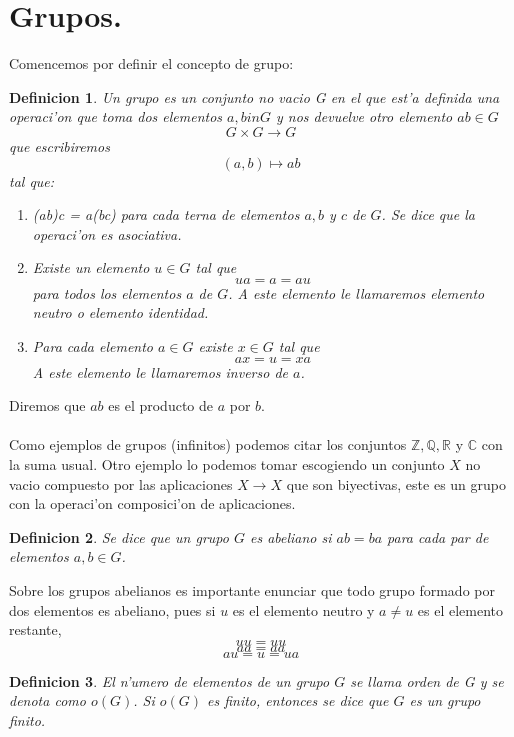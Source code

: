 \documentclass[a4paper,openright,12pt]{report}
\numberwithin{equation}{section} %
\newtheorem{definicion}{Definicion}[section] %
\begin{document}
\section{Grupos.}
Comencemos por definir el concepto de grupo:
\begin{definicion}
Un grupo es un conjunto no vacio G en el que est'a definida una operaci'on que toma dos elementos $a,b in G$ y nos devuelve otro elemento $ab \in G$
 \[G \times G \rightarrow G \]
que escribiremos \[ (a,b) \mapsto ab \]
tal que:
\begin{enumerate}
\item \textit{(ab)c} = \textit{a(bc)} para cada terna de elementos $a,b$ y $c$ de $G$. Se dice que la operaci'on es \textit{asociativa}.
\item Existe un elemento $u \in G$ tal que \[ua =a=au\] para todos los elementos $a$ de $G$. A este elemento le llamaremos \textit{elemento neutro o elemento identidad}.
\item Para cada elemento $a \in G$ existe $x \in G$ tal que \[ax=u=xa\] A este elemento le llamaremos \textit{inverso} de $a$.
\end{enumerate}
\end{definicion}
Diremos que $ab$ es el producto de $a$ por $b$.\\
\\
Como ejemplos de grupos (infinitos) podemos citar los conjuntos $ \mathbb{Z}, \mathbb{Q}, \mathbb{R}$ y $ \mathbb{C}$ con la suma usual. Otro ejemplo lo podemos tomar escogiendo un conjunto $X$ no vacio compuesto por las aplicaciones $X \rightarrow X$ que son biyectivas, este es un grupo con la operaci'on composici'on de aplicaciones.
\begin{definicion}
Se dice que un grupo $G$ es abeliano si $ab=ba$ para cada par de elementos $a,b \in G$.
\end{definicion}
Sobre los grupos abelianos es importante enunciar que todo grupo formado por dos elementos es abeliano, pues si $u$ es el elemento neutro y $a \neq u$ es el elemento restante, \[ uu=uu\] \[ aa=aa\] \[ au=u=ua\]
\begin{definicion}
El n'umero de elementos de un grupo $G$ se llama \textit{orden de G} y se denota como $o(G)$. Si $o(G)$ es finito, entonces se dice que $G$ es un \textit{grupo finito}.
\end{definicion}
\end{document}
